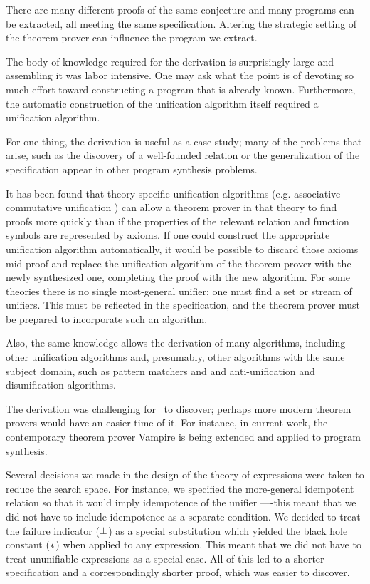 \documentclass[runningheads]{llncs}
\begin{document}
There are many different proofs of the same conjecture and many programs can be extracted, all meeting the same specification.  Altering the strategic setting of the theorem prover can influence the program we extract. 

The body of knowledge required for the derivation is surprisingly large and assembling it was labor intensive.  One may ask what the point is of devoting so much effort toward constructing a program that is already known.  Furthermore, the automatic construction of the unification algorithm itself required a unification algorithm.

For one thing, the derivation is useful as a case study;  many of the problems that arise, such as the discovery of a well-founded relation or the generalization of the specification appear in other program synthesis problems.

It has been found that theory-specific unification algorithms (e.g. associative-commutative unification  \citep{sti:acu, liv-siek:acu}) can allow a theorem prover in that theory to find proofs more quickly than if the properties of the relevant relation and function symbols are represented by axioms.  If one could construct the appropriate unification algorithm automatically, it would be possible to discard those axioms mid-proof and replace the unification algorithm of the theorem prover with the newly synthesized one, completing the proof with the new algorithm.   For some theories there is no single most-general unifier;  one must find a set or stream of unifiers. This must be reflected in the specification, and the theorem prover must be prepared to incorporate such an algorithm.

Also, the same knowledge allows the derivation of many algorithms, including other unification algorithms and, presumably, other algorithms with the same subject domain, such as pattern matchers and and anti-unification \citep{plo:au} and disunification  \citep{comon:disu} algorithms.


The derivation was challenging for \SNARK\ to discover; perhaps more modern theorem provers would have an easier time of it.    For instance, in current work, the contemporary theorem prover {\sc Vampire} \citep{hoz} is being extended and applied to program synthesis.

Several decisions we made in the design of the theory of expressions were taken to reduce the search space.  For instance, we specified the more-general idempotent relation so that it would imply idempotence of the unifier ----this meant that we did not have to include idempotence as a separate condition.  We decided to treat the failure indicator ($\bot$) as a special substitution which yielded the black hole constant ($\ast$) when applied to any expression.  This meant that we did not have to treat ununifiable expressions as a special case. All of this led to a shorter specification and a correspondingly shorter proof, which was easier to discover.
\end{document}
